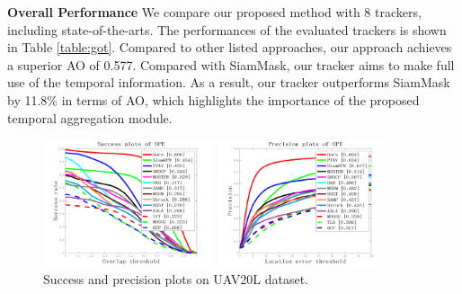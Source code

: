 \documentclass{article}
\begin{document}
\textbf{Overall Performance}
We compare our proposed method with 8 trackers, including state-of-the-arts.
The performances of the evaluated trackers is shown in Table \ref{table:got}.
Compared to other listed approaches, our approach achieves a superior AO of 0.577.
Compared with SiamMask, our tracker aims to make full use of the temporal information. As a result, our tracker outperforms SiamMask by 11.8\% in terms of AO, which highlights the importance of the proposed temporal aggregation module.

\begin{figure}[t]
\begin{minipage}[b]{.48\linewidth}
  \centering
  \centerline{\includegraphics[width=5.0cm]{images/quality_plot_overlap_OPE_AUC.png}}
\end{minipage}
\hfill
\begin{minipage}[b]{0.48\linewidth}
  \centering
  \centerline{\includegraphics[width=5.0cm]{images/quality_plot_error_OPE_threshold.png}}
\end{minipage}
\vspace{-5mm}
%
\caption{Success and precision plots on UAV20L dataset.}
\vspace{-3mm}
\label{fig:uav20l}
%
\end{figure}
\vspace{-2mm}
\end{document}
